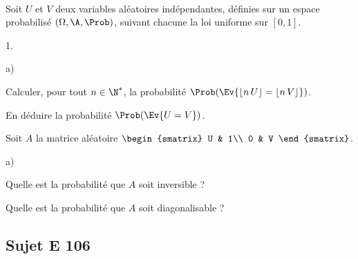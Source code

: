 \documentclass[11pt]{article}%
\begin{document}
\begin{exerciceSP}~\\
  Soit $U$ et $V$ deux variables aléatoires indépendantes, définies 
  sur un espace probabilisé $(\Omega, \A, \Prob)$, suivant chacune 
  la loi uniforme sur $[0,1]$.
  \begin{noliste}{1.}
    \setlength{\itemsep}{2mm}
    \item 
    \begin{noliste}{a)}
    \setlength{\itemsep}{2mm}
      \item Calculer, pour tout $n\in \N^*$, la probabilité 
      $\Prob(\Ev{\lfloor n \, U \rfloor = \lfloor n \, V \rfloor})$.
      
      \item En déduire la probabilité $\Prob(\Ev{U=V})$.
    \end{noliste}
    
    \item Soit $A$ la matrice aléatoire $
    \begin{smatrix}
      U & 1\\
      0 & V
    \end{smatrix}$.
    \begin{noliste}{a)}
    \setlength{\itemsep}{2mm}
      \item Quelle est la probabilité que $A$ soit inversible ?
      
      \item Quelle est la probabilité que $A$ soit diagonalisable ?
    \end{noliste}
  \end{noliste}
\end{exerciceSP}



\newpage



\subsection*{Sujet E 106}

\end{document}
